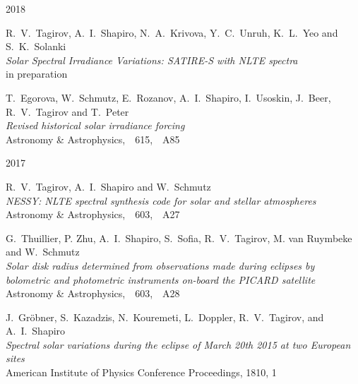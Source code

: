 

\begin{cventries}

  \cventry
    {}     %
    {}     %
    {}     %
    {2018} %
    {
      \begin{cvitems} %
        \item {R.~V.~Tagirov, A.~I.~Shapiro, N.~A.~Krivova, Y.~C.~Unruh, K.~L.~Yeo and S.~K.~Solanki\\
               \textit{Solar Spectral Irradiance Variations: SATIRE-S with NLTE spectra}\\
               in preparation}\\
        \item {T.~Egorova, W.~Schmutz, E.~Rozanov, A.~I.~Shapiro, I.~Usoskin, J.~Beer, R.~V.~Tagirov and T.~Peter\\
               \textit{Revised historical solar irradiance forcing}\\
               Astronomy \& Astrophysics,\ \ 615,\ \ A85}
      \end{cvitems}
    }

  \cventry
    {}     %
    {}     %
    {}     %
    {2017} %
    {
      \begin{cvitems} %
        \item {R.~V.~Tagirov, A.~I.~Shapiro and W.~Schmutz\\
               \textit{NESSY: NLTE spectral synthesis code for solar and stellar atmospheres}\\
               Astronomy \& Astrophysics,\ \ 603,\ \ A27}\\
        \item {G.~Thuillier, P. Zhu, A.~I.~Shapiro, S.~Sofia, R.~V.~Tagirov, M. van Ruymbeke and W.~Schmutz\\
              \textit{Solar disk radius determined from observations made during eclipses by bolometric and photometric instruments on-board the PICARD satellite}\\
               Astronomy \& Astrophysics,\ \ 603,\ \ A28}\\
        \item {J.~Gr\"{o}bner, S.~Kazadzis, N.~Kouremeti, L.~Doppler, R.~V.~Tagirov, and A.~I.~Shapiro\\
              \textit{Spectral solar variations during the eclipse of March 20th 2015 at two European sites}\\
              American Institute of Physics Conference Proceedings, 1810, 1}
      \end{cvitems}
    }


\end{cventries}
